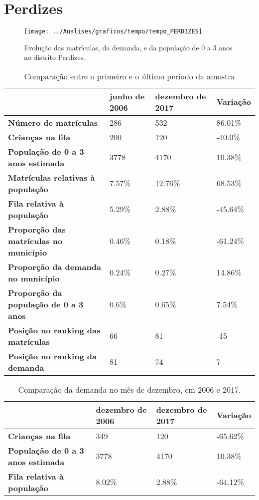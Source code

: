 \section{Perdizes}
\begin{figure}[H]
\centering
\texttt{[image: ../Analises/graficos/tempo/tempo\_PERDIZES]}
\caption{Evolução das matrículas, da demanda, e da população de 0 a 3 anos no distrito Perdizes.}
\end{figure}
\begin{table}[H]
\begin{tabular}{|l|l|l|l|}
\hline
\textbf{}                                      & \textbf{junho de 2006}       & \textbf{dezembro de 2017}    & \textbf{Variação} \\ \hline
\textbf{Número de matrículas}                  & 286 & 532 & 86.01\% \\ \hline
\textbf{Crianças na fila}                      & 200 & 120 & -40.0\% \\ \hline
\textbf{População de 0 a 3 anos estimada}      & 3778 & 4170 & 10.38\% \\ \hline
\textbf{Matrículas relativas à população}      & 7.57\% & 12.76\% & 68.53\% \\ \hline
\textbf{Fila relativa à população}             & 5.29\% & 2.88\% & -45.64\% \\ \hline
\textbf{Proporção das matrículas no município} & 0.46\% & 0.18\% & -61.24\% \\ \hline
\textbf{Proporção da demanda no município}     & 0.24\% & 0.27\% & 14.86\% \\ \hline
\textbf{Proporção da população de 0 a 3 anos}  & 0.6\% & 0.65\% & 7.54\% \\ \hline
\textbf{Posição no ranking das matrículas}     & 66 & 81 & -15 \\ \hline
\textbf{Posição no ranking da demanda}         & 81 & 74 & 7 \\ \hline
\end{tabular}
\caption{Comparação entre o primeiro e o último período da amostra}
\end{table}
\begin{table}[H]
\begin{tabular}{|l|l|l|l|}
\hline
\textbf{}                                 & \textbf{dezembro de 2006} & \textbf{dezembro de 2017} & \textbf{Variação} \\ \hline
\textbf{Crianças na fila}                      & 349 & 120 & -65.62\% \\ \hline
\textbf{População de 0 a 3 anos estimada}      & 3778 & 4170 & 10.38\% \\ \hline
\textbf{Fila relativa à população}             & 8.02\% & 2.88\% & -64.12\% \\ \hline
\end{tabular}
\caption{Comparação da demanda no mês de dezembro, em 2006 e 2017.}
\end{table}
